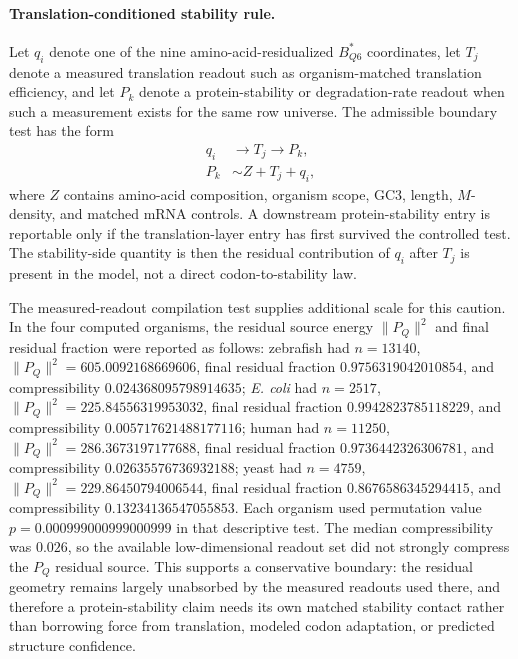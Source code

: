 \paragraph{Translation-conditioned stability rule.}
Let $q_i$ denote one of the nine amino-acid-residualized $B^{*}_{Q6}$ coordinates, let $T_j$ denote a measured translation readout such as organism-matched translation efficiency, and let $P_k$ denote a protein-stability or degradation-rate readout when such a measurement exists for the same row universe. The admissible boundary test has the form
$$
\begin{aligned}
q_i &\longrightarrow T_j \longrightarrow P_k,\\
P_k &\sim Z + T_j + q_i,
\end{aligned}
$$
where $Z$ contains amino-acid composition, organism scope, GC3, length, $M$-density, and matched mRNA controls. A downstream protein-stability entry is reportable only if the translation-layer entry has first survived the controlled test. The stability-side quantity is then the residual contribution of $q_i$ after $T_j$ is present in the model, not a direct codon-to-stability law.

The measured-readout compilation test supplies additional scale for this caution. In the four computed organisms, the residual source energy $\|P_Q\|^2$ and final residual fraction were reported as follows: zebrafish had $n=13140$, $\|P_Q\|^2=605.0092168669606$, final residual fraction $0.9756319042010854$, and compressibility $0.024368095798914635$; \emph{E. coli} had $n=2517$, $\|P_Q\|^2=225.84556319953032$, final residual fraction $0.9942823785118229$, and compressibility $0.005717621488177116$; human had $n=11250$, $\|P_Q\|^2=286.3673197177688$, final residual fraction $0.9736442326306781$, and compressibility $0.02635576736932188$; yeast had $n=4759$, $\|P_Q\|^2=229.86450794006544$, final residual fraction $0.8676586345294415$, and compressibility $0.13234136547055853$. Each organism used permutation value $p=0.000999000999000999$ in that descriptive test. The median compressibility was $0.026$, so the available low-dimensional readout set did not strongly compress the $P_Q$ residual source. This supports a conservative boundary: the residual geometry remains largely unabsorbed by the measured readouts used there, and therefore a protein-stability claim needs its own matched stability contact rather than borrowing force from translation, modeled codon adaptation, or predicted structure confidence.

